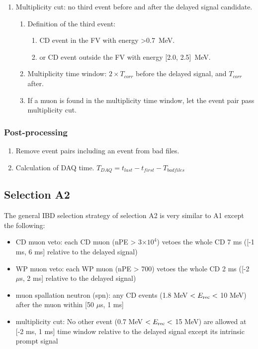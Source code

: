 \begin{enumerate}
\begin{enumerate}
        \end{enumerate}
        \item Multiplicity cut: no third event before and after the delayed signal candidate.
        \begin{enumerate}
            \item Definition of the third event:
            \begin{enumerate}
                \item CD event in the FV with energy >0.7~MeV.
                \item or CD event outside the FV with energy [2.0, 2.5]~MeV.
            \end{enumerate}
            \item Multiplicity time window: $2 \times T_{corr}$ before the delayed signal, and $T_{corr}$ after.
            \item If a muon is found in the multiplicity time window, let the event pair pass multiplicity cut.
        \end{enumerate}
    \end{enumerate}
    \subsubsection{Post-processing} 
    \begin{enumerate}
        \item Remove event pairs including an event from bad files.
        \item Calculation of DAQ time. $T_{DAQ} =  t_{last} - t_{first} - T_{bad files}$
    \end{enumerate}


\subsection{Selection A2}

The general IBD selection strategy of selection A2 is very similar to A1 except the following:

\begin{itemize}
    \item CD muon veto: each CD muon (nPE > 3$\times 10^4$) vetoes the whole CD 7 ms ([-1 ms, 6 ms] relative to the delayed signal)
    \item WP muon veto: each WP muon (nPE > 700) vetoes the whole CD 2 ms ([-2 $\mu$s, 2 ms] relative to the delayed signal)
    \item muon spallation neutron (spn): any CD events (1.8 MeV $< E_{\rm rec} < $ 10 MeV) after the muon within [50 $\mu$s, 1 ms]
    \item multiplicity cut: No other event (0.7 MeV $< E_{\rm rec} < $ 15 MeV) are allowed at [-2 ms, 1 ms] time window relative to the delayed signal except its intrinsic prompt signal
\end{itemize}

